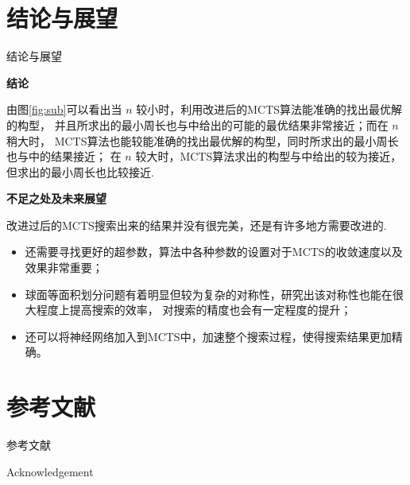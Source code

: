 \documentclass[12pt,aspectratio=169]{beamer}
\begin{document}
\section{结论与展望}

\begin{frame}{结论与展望}

  \textbf{结论}

  由图\ref{fig:sub}可以看出当 $n$ 较小时，利用改进后的MCTS算法能准确的找出最优解的构型，
  并且所求出的最小周长也与\cite{cox2010minimal}中给出的可能的最优结果非常接近；而在 $n$ 稍大时，
  MCTS算法也能较能准确的找出最优解的构型，同时所求出的最小周长也与\cite{cox2010minimal}中的结果接近；
  在 $n$ 较大时，MCTS算法求出的构型与\cite{cox2010minimal}中给出的较为接近，但求出的最小周长也比较接近. 

  \textbf{不足之处及未来展望}

  改进过后的MCTS搜索出来的结果并没有很完美，还是有许多地方需要改进的. 

  \begin{itemize}

    \item 还需要寻找更好的超参数，算法中各种参数的设置对于MCTS的收敛速度以及效果非常重要；
    \item 球面等面积划分问题有着明显但较为复杂的对称性，研究出该对称性也能在很大程度上提高搜索的效率，
    对搜索的精度也会有一定程度的提升；
    \item 还可以将神经网络加入到MCTS中，加速整个搜索过程，使得搜索结果更加精确。

  \end{itemize}

\end{frame}

\section{参考文献}

\begin{frame}{参考文献}
  
  \printbibliography[heading=none]

\end{frame}

\begin{frame}{Acknowledgement}

  \begin{center}

    \textcolor{gray}{\Huge{\centerline{}}}

  \end{center}

\end{frame}
\end{document}
